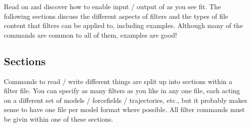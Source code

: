 Read on and discover how to enable input / output of  as you see fit. The following sections discuss the different aspects of filters and the types of file content that filters can be applied to, including examples. Although many of the commands are common to all of them, examples are good!

\subsection{Sections}
Commands to read / write different things are split up into sections within a filter file. You can specify as many filters as you like in any one file, each acting on a different set of models / forcefields / trajectories, etc., but it probably makes sense to have one file per model format where possible. All filter commands must be givin within one of these sections.

